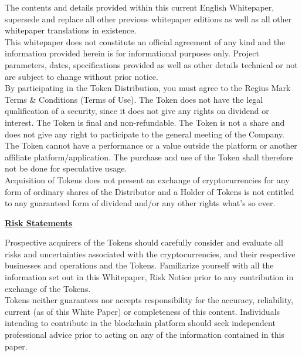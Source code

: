 \documentclass[12pt,a4paper]{article}
\begin{document}
  The contents and details provided within this current English Whitepaper,
  supersede and replace all other previous whitepaper editions as well as all
  other whitepaper translations in existence.\\

  This whitepaper does not constitute an official agreement of any kind and the
  information provided herein is for informational purposes only. Project
  parameters, dates, specifications provided as well as other details technical
  or not are subject to change without prior notice.\\

  By participating in the Token Distribution, you must agree to the Regius Mark
  Terms \& Conditions (Terms of Use). The Token does not have the legal
  qualification of a security, since it does not give any rights on dividend or
  interest. The Token is final and non-refundable. The Token is not a share and
  does not give any right to participate to the general meeting of the Company.
  The Token cannot have a performance or a value outside the platform or another
  affiliate platform/application. The purchase and use of the Token shall
  therefore not be done for speculative usage.\\

  Acquisition of Tokens does not present an exchange of cryptocurrencies for any
  form of ordinary shares of the Distributor and a Holder of Tokens is not
  entitled to any guaranteed form of dividend and/or any other rights what’s so
  ever.

  \begin{center}
    \textbf{\underline{Risk Statements}}
  \end{center}

  Prospective acquirers of the Tokens should carefully consider and evaluate all
  risks and uncertainties associated with the cryptocurrencies, and their
  respective businesses and operations and the Tokens. Familiarize yourself with
  all the information set out in this Whitepaper, Risk Notice prior to any
  contribution in exchange of the Tokens.\\

  Tokens neither guarantees nor accepts responsibility for the accuracy,
  reliability, current (as of this White Paper) or completeness of this content.
  Individuals intending to contribute in the blockchain platform should seek
  independent professional advice prior to acting on any of the information
  contained in this paper.\\
\end{document}
